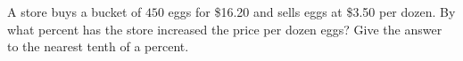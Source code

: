 A store buys a bucket of $450$ eggs for \$16.20 and sells eggs at \$3.50 per dozen. By what percent has the store increased the price per dozen eggs? Give the answer to the nearest tenth of a percent.
